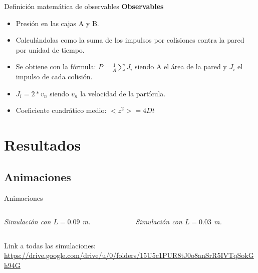 \documentclass{beamer}
\begin{document}
\begin{frame}{Definición matemática de observables}
  \textbf{Observables}
  \begin{itemize}
    \item Presión en las cajas A y B.
    \item Calculándolas como la suma de los impulsos por colisiones contra la pared por unidad de tiempo.
    \item Se obtiene con la fórmula: $P = \frac{1}{A} \sum J_i$ siendo A el área de la pared y $J_i$ el impulso de cada colisión.
    \item $J_i = 2 * v_n$ siendo $v_n$ la velocidad de la partícula.
    \item Coeficiente cuadrático medio: $<z^2> = 4Dt$
  \end{itemize}
\end{frame}

\section{Resultados}
\subsection{Animaciones}
 \begin{frame}{Animaciones}
  \begin{columns}
    \begin{column}{0.5\textwidth}
      \tiny \textit{Simulación con $L = \textit{0.09}$ m.}
    \end{column}
    \begin{column}{0.5\textwidth}
      \tiny \textit{Simulación con $L = \textit{0.03}$ m.}
    \end{column}
  \end{columns}
  \footnotesize Link a todas las simulaciones: \url{https://drive.google.com/drive/u/0/folders/15U5c1PUR8tJ0o8anSrR5IVTqSokGh94G}
\end{frame}
\end{document}
